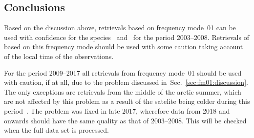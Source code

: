 \subsection{Conclusions}
\label{sec:fm01:conclusions}
Based on the discussion above, retrievals based on frequency mode~01 can be
used with confidence for the species~ and~ for the
period 2003--2008. Retrievals of  based on this frequency mode
should be used with some caution taking account of the local time of the
observations.

For the period 2009--2017  all retrievals from frequency mode~01 should be
used with  caution, if at all, due to the problem discussed
in~Sec.~\ref{sec:fm01:discussion}. The only exceptions are retrievals from the
middle of the arctic summer, which are not affected by this problem as a result of the
satelite being colder during this period~\cite{postlaunch:2006}. The problem
was fixed in late 2017, wherefore data from 2018 and onwards should have the
same quality as that of 2003--2008. This will be checked when the full data set is processed.
